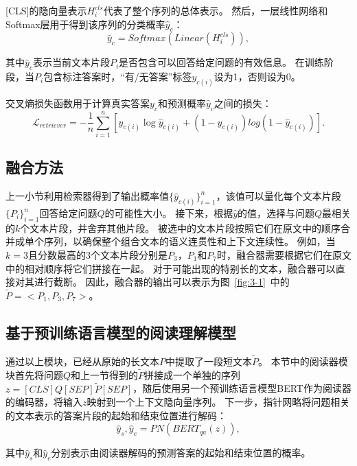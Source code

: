 [CLS]的隐向量表示$H^{cls}_i$代表了整个序列的总体表示。
然后，一层线性网络和Softmax层用于得到该序列的分类概率$\hat y_c$：
\begin{equation}
    \hat y_c=Softmax(Linear(H_i^{cls})),
\end{equation}

其中$\hat y_c$表示当前文本片段$P_i$是否包含可以回答给定问题的有效信息\cite{zhang2020retrospective}。
在训练阶段，当$P_i$包含标注答案时，“有/无答案”标签$y_{c(i)}$设为1，否则设为0。

交叉熵损失函数用于计算真实答案$y_c$和预测概率$\hat y_c$之间的损失：
\begin{equation}
    \mathcal  L_{retriever}  = -\frac{1}{n}\sum_{i=1}^{n}[y_{c(i)}\log\hat y_{c(i)}+(1-y_{c(i)})log(1-\hat y_{c(i)})].
\end{equation}

\subsection{融合方法}
上一小节利用检索器得到了输出概率值$\{\hat y_{c(i)}\}^n_{i=1}$，该值可以量化每个文本片段$\{P_i\}^n_{i=1}$回答给定问题$Q$的可能性大小。
接下来，根据$\hat y$的值，选择与问题$Q$最相关的$k$个文本片段，并舍弃其他片段。
被选中的文本片段按照它们在原文中的顺序合并成单个序列，以确保整个组合文本的语义连贯性和上下文连续性。
例如，当$k=3$且分数最高的3个文本片段分别是$P_3$，$P_1$和$P_7$时，融合器需要根据它们在原文中的相对顺序将它们拼接在一起。
对于可能出现的特别长的文本，融合器可以直接对其进行截断。
因此，融合器的输出可以表示为图~\ref{fig:3-1}~中的$\tilde P=<P_1,P_3,P_7>$。

\subsection{基于预训练语言模型的阅读理解模型}
通过以上模块，已经从原始的长文本$P$中提取了一段短文本$\tilde P$。
本节中的阅读器模块首先将问题$Q$和上一节得到的$\tilde P$拼接成一个单独的序列$z=[CLS]Q[SEP]\tilde P[SEP]$，随后使用另一个预训练语言模型BERT\cite{devlin2018bert}作为阅读器的编码器，将输入$z$映射到一个上下文隐向量序列。
下一步，指针网略将问题相关的文本表示的答案片段的起始和结束位置进行解码：
\begin{equation}
    \hat y_s,\hat y_e = PN(BERT_{qa}(z)),
\end{equation}

其中$\hat y_s$和$\hat y_e$分别表示由阅读器解码的预测答案的起始和结束位置的概率。

